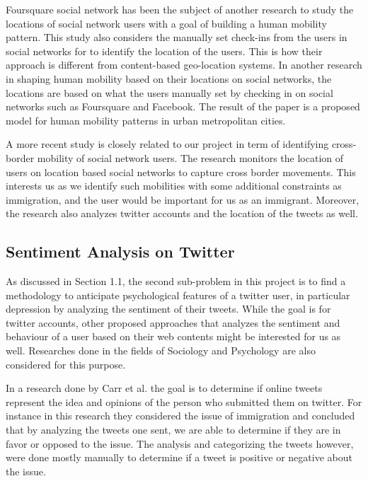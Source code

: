 \documentclass{article}
\begin{document}
Foursquare social network has been the subject of another research \cite{ref11} to study the locations of social network users with a goal of building a human mobility pattern. This study also considers the manually set check-ins from the users in social networks for to identify the location of the users. This is how their approach is different from content-based geo-location systems. In another research \cite{ref12} in shaping human mobility based on their locations on social networks, the locations are based on what the users manually set by checking in on social networks such as Foursquare and Facebook. The result of the paper is a proposed model for human mobility patterns in urban metropolitan cities.

A more recent study \cite{ref13} is closely related to our project in term of identifying cross-border mobility of social network users. The research monitors the location of users on location based social networks to capture cross border movements. This interests us as we identify such mobilities with some additional constraints as immigration, and the user would be important for us as an immigrant. Moreover, the research also analyzes twitter accounts and the location of the tweets as well. 

\subsection{Sentiment Analysis on Twitter}

As discussed in Section 1.1, the second sub-problem in this project is to find a methodology to anticipate psychological features of a twitter user, in particular depression by analyzing the sentiment of their tweets. While the goal is for twitter accounts, other proposed approaches that analyzes the sentiment and behaviour of a user based on their web contents might be interested for us as well. Researches done in the fields of Sociology and Psychology are also considered for this purpose.

In a research \cite{ref14} done by Carr et al. the goal is to determine if online tweets represent the idea and opinions of the person who submitted them on twitter. For instance in this research they considered the issue of immigration and concluded that by analyzing the tweets one sent, we are able to determine if they are in favor or opposed to the issue. The analysis and categorizing the tweets however, were done mostly manually to determine if a tweet is positive or negative about the issue.
\end{document}
